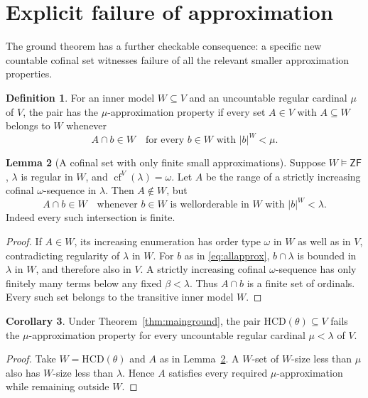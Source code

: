\documentclass[11pt,letterpaper]{article}
\theoremstyle{definition}
\newtheorem{definition}{Definition}[section]
\newtheorem{lemma}[definition]{Lemma}
\newtheorem{corollary}[definition]{Corollary}
\newcommand{\ZF}{\mathsf{ZF}}
\newcommand{\cf}{\operatorname{cf}}
\newcommand{\HCD}{\mathrm{HCD}}
\numberwithin{equation}{section}
\begin{document}
\section{Explicit failure of approximation}\label{sec:approx}

The ground theorem has a further checkable consequence: a specific new countable cofinal set witnesses failure of all the relevant smaller approximation properties.

\begin{definition}
For an inner model $W\subseteq V$ and an uncountable regular cardinal $\mu$ of $V$, the pair has the $\mu$-approximation property if every set $A\in V$ with $A\subseteq W$ belongs to $W$ whenever
\[
 A\cap b\in W
 \quad\text{for every }b\in W\text{ with }|b|^W<\mu.
\]
\end{definition}

\begin{lemma}[A cofinal set with only finite small approximations]\label{lem:approx}
Suppose $W\models\ZF$, $\lambda$ is regular in $W$, and $\cf^V(\lambda)=\omega$. Let $A$ be the range of a strictly increasing cofinal $\omega$-sequence in $\lambda$. Then $A\notin W$, but
\begin{equation}\label{eq:allapprox}
 A\cap b\in W
 \quad\text{whenever }b\in W\text{ is wellorderable in }W
                         \text{ with }|b|^W<\lambda.
\end{equation}
Indeed every such intersection is finite.
\end{lemma}

\begin{proof}
If $A\in W$, its increasing enumeration has order type $\omega$ in $W$ as well as in $V$, contradicting regularity of $\lambda$ in $W$. For $b$ as in \eqref{eq:allapprox}, $b\cap\lambda$ is bounded in $\lambda$ in $W$, and therefore also in $V$. A strictly increasing cofinal $\omega$-sequence has only finitely many terms below any fixed $\beta<\lambda$. Thus $A\cap b$ is a finite set of ordinals. Every such set belongs to the transitive inner model $W$.
\end{proof}

\begin{corollary}\label{cor:approx}
Under Theorem~\ref{thm:mainground}, the pair $\HCD(\theta)\subseteq V$ fails the $\mu$-approximation property for every uncountable regular cardinal $\mu<\lambda$ of $V$.
\end{corollary}

\begin{proof}
Take $W=\HCD(\theta)$ and $A$ as in Lemma~\ref{lem:approx}. A $W$-set of $W$-size less than $\mu$ also has $W$-size less than $\lambda$. Hence $A$ satisfies every required $\mu$-approximation while remaining outside $W$.
\end{proof}
\end{document}
